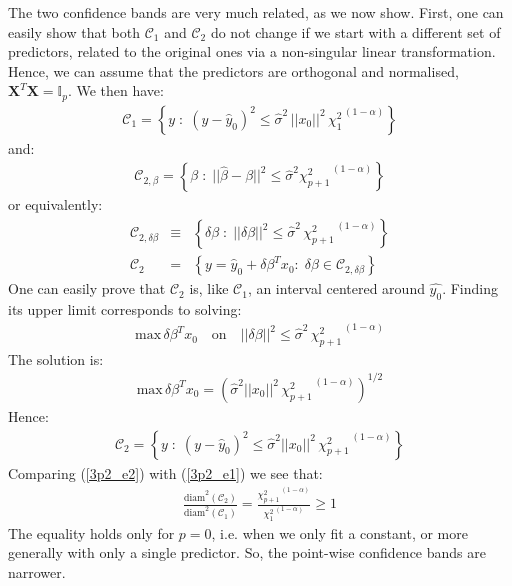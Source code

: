 The two confidence bands are very much related, as we now show. First, one can easily show that both $\mathcal{C}_1$ and $\mathcal{C}_2$
do not change if we start with a different set of predictors, related to the original ones via a non-singular linear
transformation. Hence, we can assume that the predictors are orthogonal and normalised, $ \mathbf{X}^T \mathbf{X} = \mathbb{I}_p$. We then have:
\begin{eqnarray}\label{3p2_e1}
\mathcal{C}_1 = \left\{ y\; : \; (y - \hat{y}_0)^2 \leq \hat{\sigma}^2\, ||x_0||^2\, {\chi_{1}^2} ^{\,(1- \alpha)} \right\}
\end{eqnarray}
and:
\begin{eqnarray*}
\mathcal{C}_{2, \beta} = \left\{ \beta \; : \; || \hat{\beta} - \beta ||^2 \leq \hat{\sigma}^2 {\chi_{p + 1}^2} ^{\,(1- \alpha)} \right\}
\end{eqnarray*}
or equivalently:
\begin{eqnarray*}
	\mathcal{C}_{2, \delta \beta} & \equiv & \left\{ \delta \beta \; : \; || \delta \beta || ^2 \leq  \hat{\sigma}^2 \, {\chi_{p + 1}^2} ^{\,(1- \alpha)} \right\} \\
\mathcal{C}_2 & = & \left\{ y = \hat{y}_0 + \delta \beta^T x_0: \; \delta \beta \in \mathcal{C}_{2, \delta \beta} \right\} 
\end{eqnarray*}
One can easily prove that $\mathcal{C}_2$ is, like $\mathcal{C}_1$, an interval centered around $\hat{y_0}$. Finding its upper limit corresponds to solving:
\begin{eqnarray*}
\textrm{max} \, \delta \beta^T x_0 \quad \textrm{on} \quad || \delta \beta || ^2 \leq  \hat{\sigma}^2 \, {\chi_{p + 1}^2}^{\,(1- \alpha)}
\end{eqnarray*}
The solution is:
\begin{eqnarray*}
\textrm{max} \, \delta \beta^T x_0 = \left(  \hat{\sigma}^2 ||x_0||^2 \, {\chi_{p + 1}^2}^{\,(1- \alpha)}  \right) ^{1/2}
\end{eqnarray*}
Hence:
\begin{eqnarray} \label{3p2_e2}
\mathcal{C}_2 = \left\{ y \; : \; (y - \hat{y}_0)^2 \leq \hat{\sigma}^2 ||x_0||^2 \, {\chi_{p + 1}^2}^{\,(1- \alpha)} \right\}
\end{eqnarray}
Comparing (\ref{3p2_e2}) with (\ref{3p2_e1}) we see that:
\begin{eqnarray}
\frac{\textrm{diam}^2(\mathcal{C}_2)}{\textrm{diam}^2(\mathcal{C}_1)} = \frac{{\chi_{p + 1}^2}^{\,(1- \alpha)}}{{\chi_{1}^2}^{\,(1- \alpha)}} \geq 1
\end{eqnarray}
The equality holds only for $p = 0$, i.e. when we only fit a constant, or more generally with only a single predictor. So, the point-wise confidence bands are narrower.

